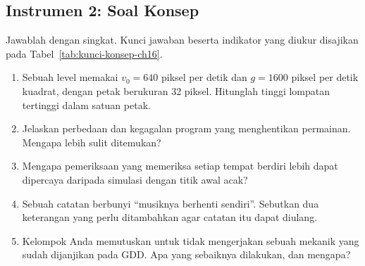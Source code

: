 \subsection*{Instrumen 2: Soal Konsep}

Jawablah dengan singkat. Kunci jawaban beserta indikator yang diukur disajikan
pada Tabel~\ref{tab:kunci-konsep-ch16}.

\begin{enumerate}
  \item Sebuah level memakai $v_0 = 640$ piksel per detik dan
        $g = 1600$ piksel per detik kuadrat, dengan petak berukuran 32 piksel.
        Hitunglah tinggi lompatan tertinggi dalam satuan petak.
  \item Jelaskan perbedaan  dan kegagalan program yang
        menghentikan permainan. Mengapa  lebih sulit
        ditemukan?
  \item Mengapa pemeriksaan yang memeriksa setiap tempat berdiri lebih dapat
        dipercaya daripada simulasi dengan titik awal acak?
  \item Sebuah catatan  berbunyi ``musiknya berhenti sendiri''.
        Sebutkan dua keterangan yang perlu ditambahkan agar catatan itu dapat
        diulang.
  \item Kelompok Anda memutuskan untuk tidak mengerjakan sebuah mekanik yang
        sudah dijanjikan pada GDD. Apa yang sebaiknya dilakukan, dan mengapa?
\end{enumerate}

